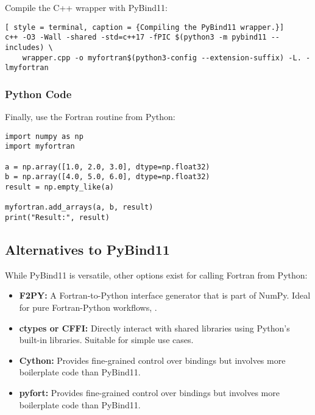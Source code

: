 Compile the C++ wrapper with PyBind11:
\begin{lstlisting}[ style = terminal, caption = {Compiling the PyBind11 wrapper.}]
c++ -O3 -Wall -shared -std=c++17 -fPIC $(python3 -m pybind11 --includes) \
    wrapper.cpp -o myfortran$(python3-config --extension-suffix) -L. -lmyfortran
\end{lstlisting}

\subsubsection{Python Code}
Finally, use the Fortran routine from Python:
\begin{lstlisting}[style=python, caption={Calling the Fortran routine in Python.}]
import numpy as np
import myfortran

a = np.array([1.0, 2.0, 3.0], dtype=np.float32)
b = np.array([4.0, 5.0, 6.0], dtype=np.float32)
result = np.empty_like(a)

myfortran.add_arrays(a, b, result)
print("Result:", result)
\end{lstlisting}

\subsection{Alternatives to PyBind11}
While PyBind11 is versatile, other options exist for calling Fortran from Python:
\begin{itemize}
    \item \textbf{F2PY:} A Fortran-to-Python interface generator that is part of NumPy. Ideal for pure Fortran-Python workflows, \cite{f2py_stable,f2py_usage}.
    \item \textbf{ctypes or CFFI:} Directly interact with shared libraries using Python's built-in libraries. Suitable for simple use cases.
    \item \textbf{Cython:} Provides fine-grained control over bindings but involves more boilerplate code than PyBind11.
    \item \textbf{pyfort:} Provides fine-grained control over bindings but involves more boilerplate code than PyBind11.
\end{itemize}


\endinput  %